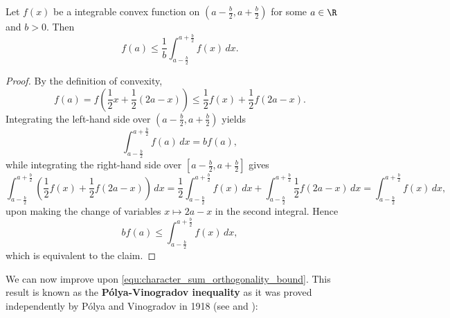     \begin{lemma}\label{lem:Polya-Vinogradov_lemma}
      Let \(f(x)\) be a integrable convex function on \(\left(a-\frac{b}{2},a+\frac{b}{2}\right)\) for some \(a \in \R\) and \(b > 0\). Then
      \[
        f(a) \le \frac{1}{b}\int_{a-\frac{b}{2}}^{a+\frac{b}{2}}f(x)\,dx.
      \]
    \end{lemma}
    \begin{proof}
      By the definition of convexity,
      \[
        f(a) = f\left(\frac{1}{2}x+\frac{1}{2}(2a-x)\right) \le \frac{1}{2}f(x)+\frac{1}{2}f(2a-x).
      \]
      Integrating the left-hand side over \(\left(a-\frac{b}{2},a+\frac{b}{2}\right)\) yields
      \[
        \int_{a-\frac{b}{2}}^{a+\frac{b}{2}}f(a)\,dx = bf(a),
      \]
      while integrating the right-hand side over \(\left[a-\frac{b}{2},a+\frac{b}{2}\right]\) gives
      \[
        \int_{a-\frac{b}{2}}^{a+\frac{b}{2}}\left(\frac{1}{2}f(x)+\frac{1}{2}f(2a-x)\right)\,dx = \frac{1}{2}\int_{a-\frac{b}{2}}^{a+\frac{b}{2}}f(x)\,dx+\int_{a-\frac{b}{2}}^{a+\frac{b}{2}}\frac{1}{2}f(2a-x)\,dx = \int_{a-\frac{b}{2}}^{a+\frac{b}{2}}f(x)\,dx,
      \]
      upon making the change of variables \(x \mapsto 2a-x\) in the second integral. Hence
      \[
        bf(a) \le \int_{a-\frac{b}{2}}^{a+\frac{b}{2}}f(x)\,dx,
      \]
      which is equivalent to the claim.
    \end{proof}
    
    We can now improve upon \cref{equ:character_sum_orthogonality_bound}. This result is known as the \textbf{P\'olya-Vinogradov inequality} as it was proved independently by P\'olya and Vinogradov in 1918 (see \cite{polya1918verteilung} and \cite{vinogradov1918distribution}):

